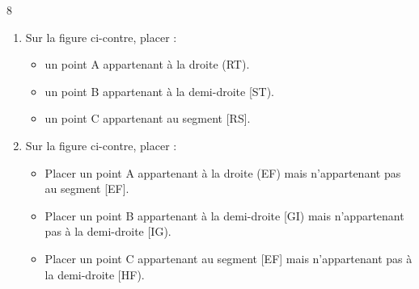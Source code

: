 \documentclass[a4paper]{book}
\begin{document}
{\begin{exerciceNote}{8}
\begin{enumerate}
            \item 
            \begin{minipage}{0.4\linewidth}
                Sur la figure ci-contre, placer :
                \begin{itemize}
                    \item un point A appartenant à la droite (RT).
                    \item un point B appartenant à la demi-droite [ST).
                    \item un point C appartenant au segment [RS].
                \end{itemize}
            \end{minipage}
            \begin{minipage}{0.49\linewidth}
                \begin{center}
                \end{center}
            \end{minipage}
            \hfill

            \bigskip
            
            \item 
            \begin{minipage}{0.5\linewidth}
                Sur la figure ci-contre, placer :

                \begin{itemize}
                    \item Placer un point A appartenant à la droite (EF) mais n'appartenant pas au segment [EF].
                    \item Placer un point B appartenant à la demi-droite [GI) mais n'appartenant pas à la demi-droite [IG).
                    \item Placer un point C appartenant au segment [EF] mais n'appartenant pas à la demi-droite [HF).
                \end{itemize}
            \end{minipage}
            \hfill
            \begin{minipage}{0.49\linewidth}
                \begin{center}
                \end{center}
            \end{minipage}


\newpage
            

\end{enumerate}
\end{exerciceNote}}
\end{document}
